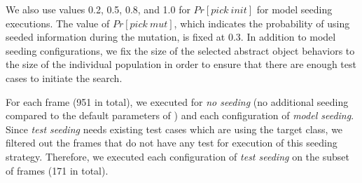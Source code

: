 
We also use values  0.2, 0.5, 0.8, and 1.0 for $Pr[pick\ init]$ for model seeding executions. The value of $Pr[pick\ mut]$, which indicates the probability of using seeded information during the mutation, is fixed at 0.3. In addition to model seeding configurations, we fix the size of the selected abstract object behaviors to the size of the individual population in order to ensure that there are enough test cases to initiate the search.







For each frame (951 in total), we executed \botsing for \emph{no seeding} (\ie no additional seeding compared to the default parameters of \botsing) and each configuration of \emph{model seeding}. 
Since \emph{test seeding} needs existing test cases which are using the target class, we filtered out the frames that do not have any test for execution of this seeding strategy. Therefore, we executed each configuration of \emph{test seeding} on the subset of frames (171 in total). 



